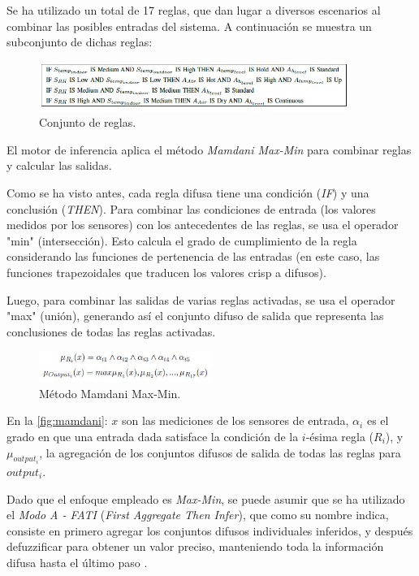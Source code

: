 \begin{enumerate}
	Se ha utilizado un total de 17 reglas, que dan lugar a diversos escenarios al combinar las posibles entradas del sistema. A continuación se muestra un subconjunto de dichas reglas:
	
	\begin{figure}[H]
		\centering
		\includegraphics[width=0.9\textwidth]{imgs/set-of-rules.JPG}
		\caption{Conjunto de reglas.}
		\label{fig:set-of-rules}
	\end{figure}
	
\end{enumerate}

El motor de inferencia aplica el método \textit{Mamdani Max-Min} para combinar reglas y calcular las salidas. 

Como se ha visto antes, cada regla difusa tiene una condición (\textit{IF}) y una conclusión (\textit{THEN}). Para combinar las condiciones de entrada (los valores medidos por los sensores) con los antecedentes de las reglas, se usa el operador "min" (intersección). Esto calcula el grado de cumplimiento de la regla considerando las funciones de pertenencia de las entradas (en este caso, las funciones trapezoidales que traducen los valores crisp a difusos).

Luego, para combinar las salidas de varias reglas activadas, se usa el operador "max" (unión), generando así el conjunto difuso de salida que representa las conclusiones de todas las reglas activadas.

\begin{figure}[H]
	\centering
	\includegraphics[width=0.50\textwidth]{imgs/mamdani.JPG}
	\caption{Método Mamdani Max-Min.}
	\label{fig:mamdani}
\end{figure}

En la \autoref{fig:mamdani}: $x$ son las mediciones de los sensores de entrada, $\alpha_i$ es el grado en que una entrada dada satisface la condición de la $i$-ésima regla ($R_i$), y $\mu_{output_i}$, la agregación de los conjuntos difusos de salida de todas las reglas para $output_i$.

Dado que el enfoque empleado es \textit{Max-Min}, se puede asumir que se ha utilizado el \textit{Modo A - FATI} (\textit{First Aggregate Then Infer}), que como su nombre indica, consiste en primero agregar los conjuntos difusos individuales inferidos, y después defuzzificar para obtener un valor preciso, manteniendo toda la información difusa hasta el último paso \parencite{peregrin2000integracion}.

